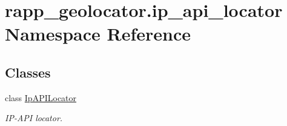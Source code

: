\hypertarget{namespacerapp__geolocator_1_1ip__api__locator}{\section{rapp\-\_\-geolocator.\-ip\-\_\-api\-\_\-locator Namespace Reference}
\label{namespacerapp__geolocator_1_1ip__api__locator}
}
\subsection*{Classes}
\begin{DoxyCompactItemize}
\item 
class \hyperlink{classrapp__geolocator_1_1ip__api__locator_1_1IpAPILocator}{Ip\-A\-P\-I\-Locator}
\begin{DoxyCompactList}\small\item\em I\-P-\/\-A\-P\-I locator. \end{DoxyCompactList}\end{DoxyCompactItemize}
